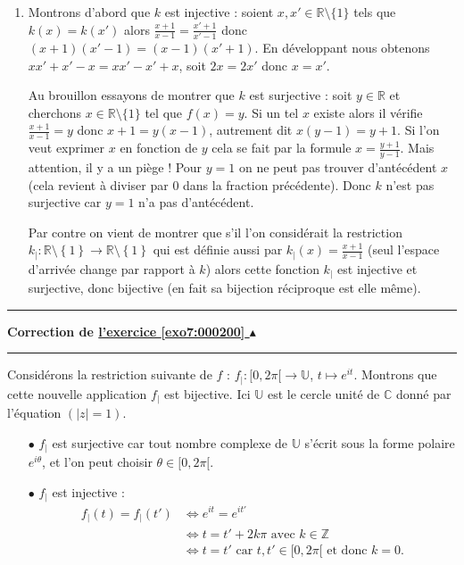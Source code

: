 \documentclass[11pt,a4paper]{article}
\newcommand{\Zz}{\mathbb{Z}} \newcommand{\Z}{\mathbb{Z}}
\newcommand{\Rr}{\mathbb{R}} \newcommand{\R}{\mathbb{R}}
\newcommand{\Cc}{\mathbb{C}} \newcommand{\C}{\mathbb{C}}
\newcounter{exo}
\newcommand{\correction}[1]{\hypertarget{cor7:#1}{}\label{cor7:#1}{\bf Correction de \hyperlink{exo7:#1}{l'exercice \ref{exo7:#1} $\blacktriangle$}}\vspace{1mm}\hrule\vspace{1mm}}
\newcommand{\fincorrection}{\vspace{1mm}\hrule\vspace*{7mm}}
\begin{document}
\begin{enumerate}
En fait on pourrait montrer directement que $h$ est bijective en exhibant sa bijection réciproque $(X,Y) \mapsto (\frac{X+Y}{2},\frac{X-Y}{2})$.
Mais vous devriez vous convaincre qu'il s'agit là d'une différence de rédaction, mais pas vraiment d'un raisonnement différent.


        
\item Montrons d'abord que $k$ est injective : soient $x,x' \in \Rr\setminus \{1\}$ tels que $k(x)=k(x')$ alors
$\frac{x + 1}{x - 1}=\frac{x' + 1}{x' - 1}$ donc $(x+1)(x'-1)=(x-1)(x'+1)$. En développant nous obtenons
$xx'+x'-x=xx'-x'+x$, soit $2x=2x'$ donc $x=x'$.

Au brouillon essayons de montrer que $k$ est surjective : soit $y\in \Rr$ et cherchons $x\in \Rr\setminus \{1\}$
tel que $f(x)=y$. Si un tel $x$ existe alors il vérifie $\frac{x + 1}{x - 1}=y$ donc
$x+1=y(x-1)$, autrement dit $x(y-1)=y+1$. Si l'on veut exprimer $x$ en fonction de $y$ cela se fait par la formule
$x = \frac{y+1}{y-1}$. Mais attention, il y a un piège ! Pour $y=1$ on ne peut pas trouver d'antécédent $x$ 
(cela revient à diviser par $0$ dans la fraction précédente).
Donc $k$ n'est pas surjective car $y=1$ n'a pas d'antécédent.

Par contre on vient de montrer que s'il l'on considérait la restriction $k_| :  {\Rr \setminus \left\{ 1\right\}} \to {\Rr \setminus \left\{ 1\right\}}$
qui est définie aussi par $k_|(x) = {\frac{x + 1}{x - 1}}$ (seul l'espace d'arrivée change par rapport à $k$) alors
cette fonction $k_|$ est injective et surjective, donc bijective (en fait sa bijection réciproque est elle même).

\end{enumerate}
\fincorrection
\correction{000200}
Considérons la restriction suivante de $f$ : $f_|:[0,2\pi[ \longrightarrow \mathbb{U}$, 
$t\mapsto e^{it}$. Montrons que cette nouvelle application $f_|$ est bijective. Ici $\mathbb{U}$
est le cercle unit\'e de $\Cc$ donn\'e par l'\'equation $(|z|=1)$.
\begin{itemize}
    \item[$\bullet$] $f_|$ est surjective car tout nombre complexe de $\mathbb{U}$ s'\'ecrit
sous la forme polaire $e^{i\theta}$, et l'on peut choisir $\theta
\in [0,2\pi[$.

    \item[$\bullet$] $f_|$ est injective :
\begin{align*}
f_|(t) = f_|(t') &\Leftrightarrow e^{it}=e^{it'}\\
&\Leftrightarrow t=t' +2k\pi \text{ avec } k\in \Zz\\
&\Leftrightarrow t=t' \text{ car } t,t'\in[0,2\pi[ \text{ et donc }k=0.\\
\end{align*}
\end{itemize}
\end{document}
